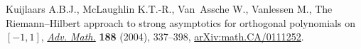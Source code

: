 Kuijlaars A.B.J., McLaughlin K.T.-R., Van~Assche W., Vanlessen M., The
 {R}iemann--{H}ilbert approach to strong asymptotics for orthogonal
 polynomials on {$[-1,1]$}, \href{https://doi.org/10.1016/j.aim.2003.08.015}{\textit{Adv. Math.}} \textbf{188} (2004), 337--398,
 \href{https://arxiv.org/abs/math.CA/0111252}{arXiv:math.CA/0111252}.
